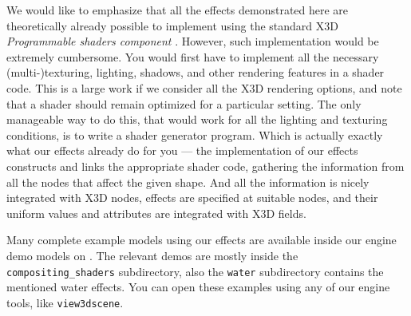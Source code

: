 \documentclass{egpubl}
\begin{document}
We would like to emphasize that all the effects demonstrated here
are theoretically already possible to implement using the standard
X3D \textit{Programmable shaders component} \cite{x3d:shaders}. However, such implementation
would be extremely cumbersome.
You would first have to implement all the necessary (multi-)texturing, lighting,
shadows, and other rendering features in a shader code.
This is a large work if we consider all the X3D rendering options, and note that
a shader should remain optimized for a particular setting.
The only manageable way to do this, that would work for all the lighting
and texturing conditions, is to write a shader generator program.
Which is actually exactly what our effects already do for you ---
the implementation of our effects constructs and links
the appropriate shader code, gathering the information from all the nodes
that affect the given shape. And all the information is nicely integrated
with X3D nodes, effects are specified at suitable nodes, and their
uniform values and attributes are integrated with X3D fields.

Many complete example models using our effects
are available inside our engine demo models on
.
The relevant demos are mostly inside the \texttt{compositing\_shaders}
subdirectory, also the \texttt{water} subdirectory contains
the mentioned water effects.
You can open these examples using any of our engine tools,
like \texttt{view3dscene}.


\end{document}
